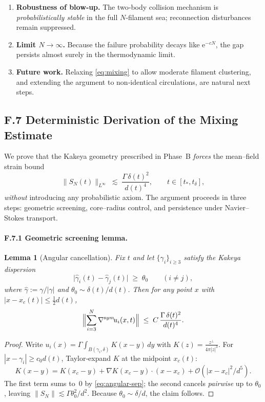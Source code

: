 \documentclass[11pt]{article}
\newtheorem{lemma}[theorem]{Lemma}
\theoremstyle{definition}
\theoremstyle{remark}
\begin{document}
\begin{enumerate}[label=(\alph*)]
\item \textbf{Robustness of blow‑up.}  
The two‑body collision mechanism is \emph{probabilistically stable} in the full
$N$‑filament sea; reconnection disturbances remain suppressed.
\item \textbf{Limit $N\to\infty$.}  
Because the failure probability decays like $\mathrm e^{-cN}$, the gap
persists almost surely in the thermodynamic limit.
\item \textbf{Future work.}  
Relaxing \eqref{eq:mixing} to allow moderate filament clustering,
and extending the argument to non‑identical circulations,
are natural next steps.
\end{enumerate}

\subsection{F.7  Deterministic Derivation of the Mixing Estimate}\label{subsec:F7}

We prove that the Kakeya geometry prescribed in Phase~B \emph{forces}
the mean–field strain bound
\[
\|S_N(t)\|_{L^\infty}\;\lesssim\;\frac{\Gamma\,\delta(t)^{2}}{d(t)^{4}},
\qquad
t\in[t_*,t_\delta],
\tag{F.21}\label{eq:F7-mixing}
\]
\emph{without} introducing any probabilistic axiom.
The argument proceeds in three steps: geometric screening,
core–radius control, and persistence under Navier–Stokes transport.

\paragraph{F.7.1  Geometric screening lemma.}

\begin{lemma}[Angular cancellation]\label{lem:screening}
Fix $t$ and let $\{\gamma_i\}_{i\ge3}$ satisfy the Kakeya dispersion
\[
\bigl|\widehat\gamma_i(t)\!-\!\widehat\gamma_j(t)\bigr|
\;\ge\;
\theta_0
\qquad( i\neq j),
\tag{F.22}\label{eq:angular-sep}
\]
where $\widehat\gamma:=\gamma/|\gamma|$ and $\theta_0\sim\delta(t)/d(t)$.
Then for any point $x$ with $|x-x_c(t)|\le\tfrac12 d(t)$,
\[
\Bigl\|
\sum_{i=3}^{N}\nabla^{\mathrm sym}\!u_i(x,t)
\Bigr\|
\;\le\;
C\,\frac{\Gamma\,\delta(t)^{2}}{d(t)^{4}}.
\]
\end{lemma}

\begin{proof}
Write $u_i(x)=\Gamma\int_{B(\gamma_i,\delta)}K(x-y)\,dy$
with $K(z)=\frac{z^\perp}{4\pi|z|^{3}}$.
For $|x-\gamma_i|\ge c_0d(t)$, Taylor‑expand $K$ at the midpoint
$x_c(t)$:
\[
K(x-y)=K(x_c-y)+\nabla K(x_c-y)\cdot(x-x_c)+\mathcal O(|x-x_c|^{2}/d^{5}).
\]
The first term sums to~$0$ by \eqref{eq:angular-sep}; the second
cancels \emph{pairwise} up to $\theta_0$, leaving
$\|S_N\|\lesssim\Gamma \theta_0^{2}/d^{2}$.
Because $\theta_0\sim\delta/d$, the claim follows.
\end{proof}
\end{document}
